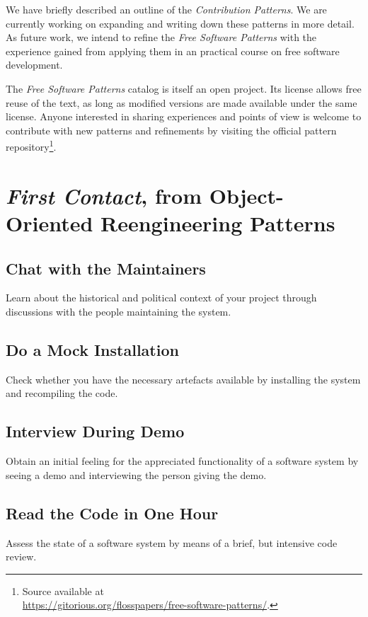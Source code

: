 \documentclass[12pt]{article}
\begin{document}
We have briefly described an outline of the \textit{Contribution Patterns}. 
We are currently working on expanding and  writing down these patterns in more detail.
As future work, we intend to refine the  \textit{Free Software Patterns} with the
experience gained from applying them in an
practical course on free software development.

The \textit{Free Software Patterns} catalog is itself an open project. Its
license allows free reuse of the text, as long as modified versions are made
available under the same license. Anyone interested in sharing experiences and
points of view is welcome to contribute with new patterns and refinements by
visiting the official pattern repository\footnote{Source available at\\
\url{https://gitorious.org/flosspapers/free-software-patterns/}.}.

\appendix

\section{\textit{First Contact}, from Object-Oriented Reengineering Patterns \cite{demeyer2008}} \label{sec:appendix}

\subsection{\textbf{Chat with the Maintainers}} \label{involvement/ChatWithMaintainers}
    Learn about the historical and political context of your project
    through discussions with the people maintaining the system.
    
\subsection{\textbf{Do a Mock Installation}} \label{involvement/DoAMockInstallation}
    Check whether you have the necessary artefacts available by
    installing the system and recompiling the code.

 \subsection{\textbf{Interview During Demo}} \label{involvement/InterviewDuringDemo}
    Obtain an initial feeling for the appreciated functionality of a
    software system by seeing a demo and interviewing the person giving
    the demo.
    
\subsection{\textbf{Read the Code in One Hour}} \label{involvement/ReadTheCodeInOneHour}
    Assess the state of a software system by means of a brief, but
    intensive code review.
    
\end{document}
